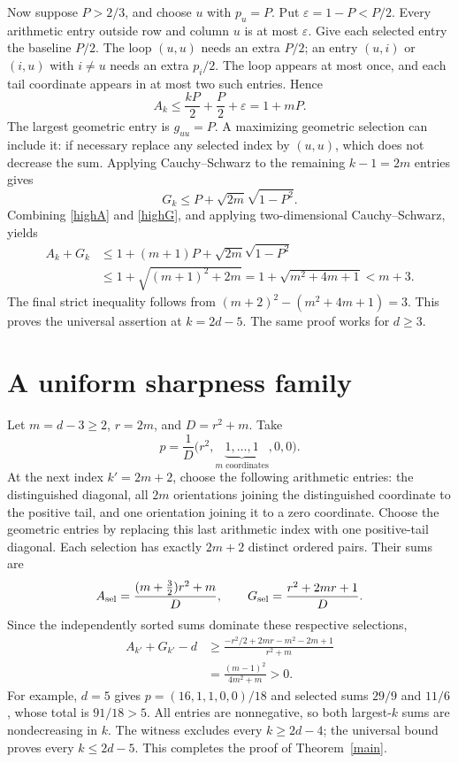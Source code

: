 \documentclass[11pt]{article}
\begin{document}
Now suppose $P>2/3$, and choose $u$ with $p_u=P$. Put
$\varepsilon=1-P<P/2$. Every arithmetic entry outside row and
column $u$ is at most $\varepsilon$. Give each selected entry the
baseline $P/2$. The loop $(u,u)$ needs an extra $P/2$; an entry
$(u,i)$ or $(i,u)$ with $i\ne u$ needs an extra $p_i/2$.
The loop appears at most once, and each tail coordinate appears in
at most two such entries. Hence
\begin{equation}\label{highA}
 A_k\le\frac{kP}{2}+\frac P2+\varepsilon=1+mP.
\end{equation}
The largest geometric entry is $g_{uu}=P$. A maximizing geometric
selection can include it: if necessary replace any selected index
by $(u,u)$, which does not decrease the sum. Applying
Cauchy--Schwarz to the remaining $k-1=2m$ entries gives
\begin{equation}\label{highG}
 G_k\le P+\sqrt{2m}\sqrt{1-P^2}.
\end{equation}
Combining \eqref{highA} and \eqref{highG}, and applying
two-dimensional Cauchy--Schwarz, yields
\begin{align*}
 A_k+G_k
 &\le1+(m+1)P+\sqrt{2m}\sqrt{1-P^2}\\
 &\le1+\sqrt{(m+1)^2+2m}
   =1+\sqrt{m^2+4m+1}<m+3.
\end{align*}
The final strict inequality follows from
$(m+2)^2-(m^2+4m+1)=3$. This proves the universal assertion at
$k=2d-5$. The same proof works for $d\ge3$.

\section{A uniform sharpness family}
Let $m=d-3\ge2$, $r=2m$, and $D=r^2+m$. Take
\[
 p=\frac1D\bigl(r^2,\underbrace{1,\ldots,1}_{m\text{ coordinates}},0,0\bigr).
\]
At the next index $k'=2m+2$, choose the following arithmetic entries:
the distinguished diagonal, all $2m$ orientations joining the
distinguished coordinate to the positive tail, and one orientation
joining it to a zero coordinate. Choose the geometric entries by
replacing this last arithmetic index with one positive-tail diagonal.
Each selection has exactly $2m+2$ distinct ordered pairs. Their sums are
\[
 A_{\rm sel}=\frac{(m+\tfrac32)r^2+m}{D},\qquad
 G_{\rm sel}=\frac{r^2+2mr+1}{D}.
\]
Since the independently sorted sums dominate these respective
selections,
\begin{align*}
 A_{k'}+G_{k'}-d
 &\ge\frac{-r^2/2+2mr-m^2-2m+1}{r^2+m}\\
 &=\frac{(m-1)^2}{4m^2+m}>0.
\end{align*}
For example, $d=5$ gives $p=(16,1,1,0,0)/18$ and selected sums
$29/9$ and $11/6$, whose total is $91/18>5$.
All entries are nonnegative, so both largest-$k$ sums are
nondecreasing in $k$. The witness excludes every $k\ge2d-4$;
the universal bound proves every $k\le2d-5$. This completes the
proof of Theorem~\ref{main}.
\end{document}
